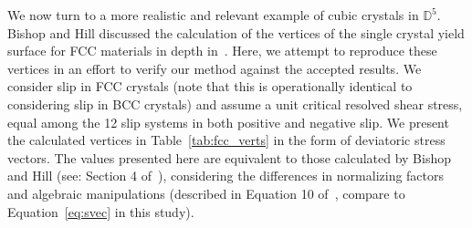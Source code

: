 \documentclass[preprint,3p,times,sort&compress,letterpaper,12pt]{elsarticle} %
\begin{document}
We now turn to a more realistic and relevant example of cubic crystals in $\mathbb{D}^5$. Bishop and Hill discussed the calculation of the vertices of the single crystal yield surface for FCC materials in depth in~\cite{Bishop1951}. Here, we attempt to reproduce these vertices in an effort to verify our method against the accepted results. We consider  slip in FCC crystals (note that this is operationally identical to considering  slip in BCC crystals) and assume a unit critical resolved shear stress, equal among the 12 slip systems in both positive and negative slip. We present the calculated vertices in Table~\ref{tab:fcc_verts} in the form of deviatoric stress vectors. The values presented here are equivalent to those calculated by Bishop and Hill (see: Section 4 of~\cite{Bishop1951}), considering the differences in normalizing factors and algebraic manipulations (described in Equation 10 of~\cite{Bishop1951}, compare to Equation~\ref{eq:svec} in this study).
\end{document}
